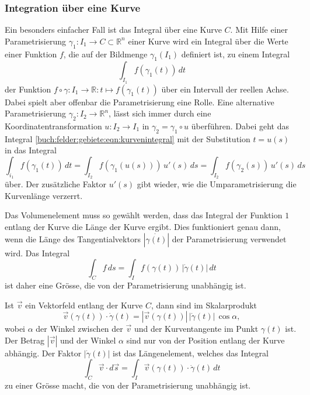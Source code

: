 %
%
\subsubsection{Integration über eine Kurve}
Ein besonders einfacher Fall ist das Integral über eine Kurve $C$.
Mit Hilfe einer Parametrisierung $\gamma_1\colon I_1\to C\subset \mathbb{R}^n$
einer Kurve wird ein Integral über die Werte einer Funktion $f$, die auf
der Bildmenge $\gamma_1(I_1)$ definiert ist, zu einem Integral
\begin{equation}
\int_{I_1}
f(\gamma_1(t))
\,dt
\label{buch:felder:gebiete:eqn:kurvenintegral}
\end{equation}
der Funktion $f\circ\gamma\colon I_1\to\mathbb{R}:t\mapsto f(\gamma_1(t))$
über ein Intervall der reellen Achse.
Dabei spielt aber offenbar die Parametrisierung eine Rolle.
Eine alternative Parametrisierung $\gamma_2\colon I_2\to\mathbb{R}^n$,
lässt sich immer durch eine Koordinatentransformation $u\colon I_2\to I_1$
in $\gamma_2 = \gamma_1\circ u$ überführen.
Dabei geht das Integral
\eqref{buch:felder:gebiete:eqn:kurvenintegral}
mit der Substitution $t=u(s)$
in das Integral
\[
\int_{i_1}
f(\gamma_1(t))
\,dt
=
\int_{I_2}
f(\gamma_1(u(s)))
\,
u'(s)
\,ds
=
\int_{I_2}
f(\gamma_2(s))
\,
u'(s)
\,ds
\]
über.
Der zusätzliche Faktor $u'(s)$ gibt wieder, wie die Umparametrisierung
die Kurvenlänge verzerrt.

Das Volumenelement muss so gewählt werden, dass das Integral der Funktion
$1$ entlang der Kurve die Länge der Kurve ergibt.
Dies funktioniert genau dann, wenn die Länge des Tangentialvektors
$|\dot{\gamma(t)}|$ der Parametrisierung verwendet wird.
Das Integral
\[
\int_C f\,ds
=
\int_I f(\gamma(t))\,|\dot{\gamma}(t)|\,dt
\]
ist daher eine Grösse, die von der Parametrisierung unabhängig ist.

Ist $\vec{v}$ ein Vektorfeld entlang der Kurve $C$, dann sind im Skalarprodukt
\[
\vec{v}(\gamma(t))\cdot \dot{\gamma}(t)
=
|\vec{v}(\gamma(t))| \, |\dot{\gamma}(t)|\, \cos \alpha,
\]
wobei $\alpha$ der Winkel zwischen der $\vec{v}$ und der Kurventangente
im Punkt $\gamma(t)$ ist.
Der Betrag $|\vec{v}|$ und der Winkel $\alpha$ sind
nur von der Position entlang der Kurve abhängig.
Der Faktor $|\dot{\gamma}(t)|$ ist das Längenelement, welches das Integral
\[
\int_C \vec{v}\cdot d\vec{s}
=
\int_I \vec{v}(\gamma(t))\cdot \dot{\gamma}(t)\,dt
\]
zu einer Grösse macht, die von der Parametrisierung unabhängig ist.

%
%

